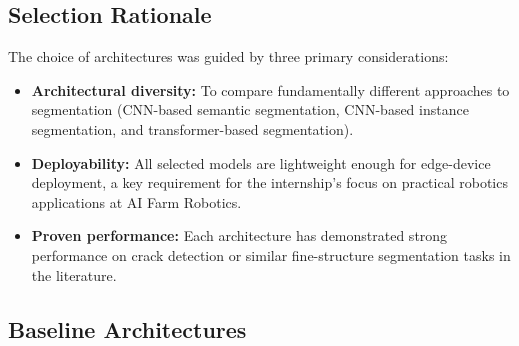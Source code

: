 \newpage

\subsection{Selection Rationale}
\label{subsec:selection_rationale}
The choice of architectures was guided by three primary considerations:

\begin{itemize}
    \item \textbf{Architectural diversity:} To compare fundamentally different approaches to segmentation (CNN-based semantic segmentation, CNN-based instance segmentation, and transformer-based segmentation).
    \item \textbf{Deployability:} All selected models are lightweight enough for edge-device deployment, a key requirement for the internship's focus on practical robotics applications at AI Farm Robotics.
    \item \textbf{Proven performance:} Each architecture has demonstrated strong performance on crack detection or similar fine-structure segmentation tasks in the literature.
\end{itemize}

\begin{table}[h]
    \centering
    \caption{\textit{Comparison of selected model architectures.}}
    \label{tab:model_comparison}
    \renewcommand{\arraystretch}{1.2}
\end{table}

\subsection{Baseline Architectures}
